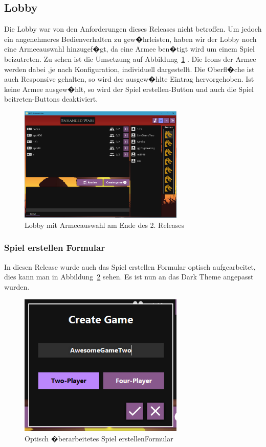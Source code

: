 \documentclass[12pt, titlepage]{scrartcl}
\newcommand{\Abb}[1]{%
	Abbildung\ \ref{#1}%
}
\begin{document}
			\subsection{Lobby}
			Die Lobby war von den Anforderungen dieses Releases nicht betroffen. Um jedoch ein angenehmeres Bedienverhalten zu gew�hrleisten, haben wir der Lobby noch eine Armeeauswahl hinzugef�gt, da eine Armee ben�tigt wird um einem Spiel beizutreten. Zu sehen ist die Umsetzung auf \Abb{LobbyFinal}. Die Icons der Armee werden dabei ,je nach Konfiguration, individuell dargestellt. Die Oberfl�che ist auch Responsive gehalten, so wird der ausgew�hlte Eintrag hervorgehoben. Ist keine Armee ausgew�hlt, so wird der Spiel erstellen-Button und auch die Spiel beitreten-Buttons deaktiviert.
			\begin{figure}[H] 
				\centering
				\includegraphics[width=0.7\textwidth]{Lobby_final.PNG}
				\caption{Lobby mit Armeeauswahl am Ende des 2. Releases}
				\label{LobbyFinal}
			\end{figure}
			
				\subsubsection{Spiel erstellen Formular}
				In diesen Release wurde auch das Spiel erstellen Formular optisch aufgearbeitet, dies kann man in \Abb{CreateGameFormularReworked} sehen. Es ist nun an das Dark Theme angepasst wurden.
				\begin{figure}[H] 
					\centering
					\includegraphics[width=0.7\textwidth]{Create_Game_final.PNG}
					\caption{Optisch �berarbeitetes \glqq Spiel erstellen\grqq Formular }
					\label{CreateGameFormularReworked}
				\end{figure}
			
\end{document}
